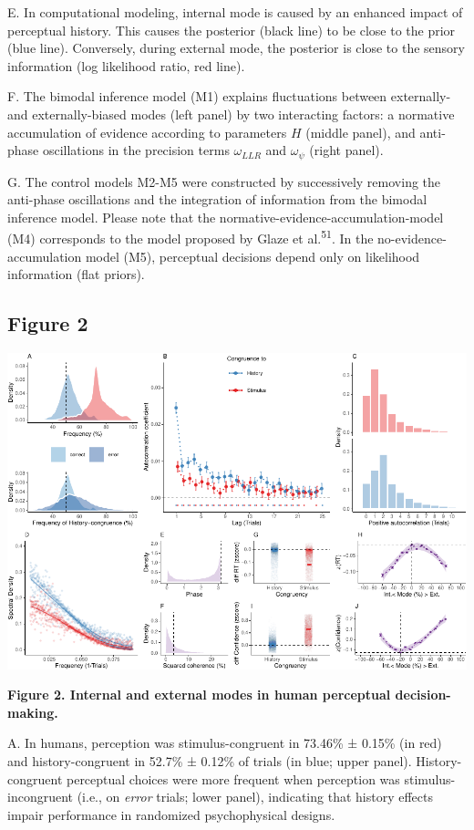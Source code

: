 \documentclass[
]{article}
\begin{document}
E. In computational modeling, internal mode is caused by an enhanced
impact of perceptual history. This causes the posterior (black line) to
be close to the prior (blue line). Conversely, during external mode, the
posterior is close to the sensory information (log likelihood ratio, red
line).

F. The bimodal inference model (M1) explains fluctuations between
externally- and externally-biased modes (left panel) by two interacting
factors: a normative accumulation of evidence according to parameters
\(H\) (middle panel), and anti-phase oscillations in the precision terms
\(\omega_{LLR}\) and \(\omega_{\psi}\) (right panel).

G. The control models M2-M5 were constructed by successively removing
the anti-phase oscillations and the integration of information from the
bimodal inference model. Please note that the
normative-evidence-accumulation-model (M4) corresponds to the model
proposed by Glaze et al.\textsuperscript{51}. In the
no-evidence-accumulation model (M5), perceptual decisions depend only on
likelihood information (flat priors).

\newpage

\hypertarget{figure-2}{%
\subsection{Figure 2}\label{figure-2}}

\includegraphics{modes_mouse_rev1b_clean_files/figure-latex/Figure_2-1.pdf}

\textbf{Figure 2. Internal and external modes in human perceptual
decision-making.}

A. In humans, perception was stimulus-congruent in 73.46\% ± 0.15\% (in
red) and history-congruent in 52.7\% ± 0.12\% of trials (in blue; upper
panel). History-congruent perceptual choices were more frequent when
perception was stimulus-incongruent (i.e., on \emph{error} trials; lower
panel), indicating that history effects impair performance in randomized
psychophysical designs.
\end{document}
